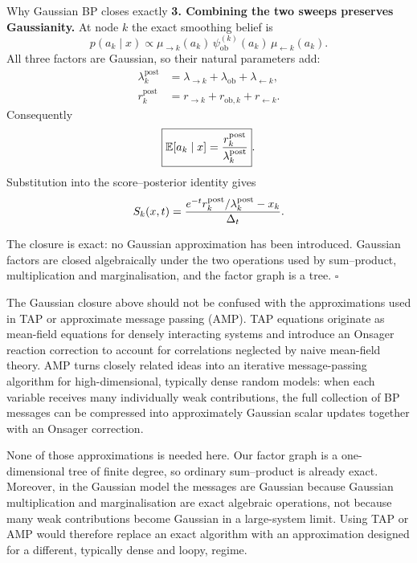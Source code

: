 \begin{toolbox}{Why Gaussian BP closes exactly}
\medskip
\noindent\textbf{3. Combining the two sweeps preserves Gaussianity.}
At node $k$ the exact smoothing belief is
\[
  p(a_k\mid x)
  \propto
  \mu_{\to k}(a_k)\,
  \psi_{\mathrm{ob}}^{(k)}(a_k)\,
  \mu_{\leftarrow k}(a_k).
\]
All three factors are Gaussian, so their natural parameters add:
\begin{align}
  \lambda_k^{\mathrm{post}}
  &=
  \lambda_{\to k}
  +\lambda_{\mathrm{ob}}
  +\lambda_{\leftarrow k},
  \label{eq:bp-belief-precision}\\
  r_k^{\mathrm{post}}
  &=
  r_{\to k}
  +r_{\mathrm{ob},k}
  +r_{\leftarrow k}.
  \label{eq:bp-belief-field}
\end{align}
Consequently
\begin{equation}
  \boxed{
  \mathbb{E}[a_k\mid x]
  =
  \frac{r_k^{\mathrm{post}}}
       {\lambda_k^{\mathrm{post}}}
  }.
  \label{eq:bp-belief-mean}
\end{equation}
Substitution into the score--posterior identity gives
\begin{equation}
  S_k(x,t)
  =
  \frac{
    e^{-t}r_k^{\mathrm{post}}/
    \lambda_k^{\mathrm{post}}
    -x_k
  }{\Delta_t}.
\end{equation}

The closure is exact: no Gaussian approximation has been introduced.
Gaussian factors are closed algebraically under the two operations used by
sum--product, multiplication and marginalisation, and the factor graph is a
tree.
\hfill$\square$
\end{toolbox}

\begin{remark}
\label{rmk:bp-no-amp}
The Gaussian closure above should not be confused with the approximations
used in TAP or approximate message passing (AMP). TAP equations originate
as mean-field equations for densely interacting systems and introduce an
Onsager reaction correction to account for correlations neglected by naive
mean-field theory. AMP turns closely related ideas into an iterative
message-passing algorithm for high-dimensional, typically dense random
models: when each variable receives many individually weak contributions,
the full collection of BP messages can be compressed into approximately
Gaussian scalar updates together with an Onsager correction.

None of those approximations is needed here. Our factor graph is a
one-dimensional tree of finite degree, so ordinary sum--product is already
exact. Moreover, in the Gaussian model the messages are Gaussian because
Gaussian multiplication and marginalisation are exact algebraic operations,
not because many weak contributions become Gaussian in a large-system
limit. Using TAP or AMP would therefore replace an exact algorithm
with an approximation designed for a different, typically dense and loopy,
regime.
\end{remark}


